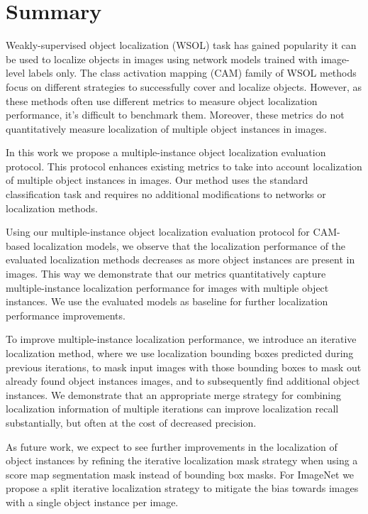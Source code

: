 \chapter*{Summary}

Weakly-supervised object localization (WSOL) task has gained popularity it can be used to localize objects in images using network models trained with image-level labels only. The class activation mapping (CAM) family of WSOL methods focus on different strategies to successfully cover and localize objects. However, as these methods often use different metrics to measure object localization performance, it's difficult to benchmark them. Moreover, these metrics do not quantitatively measure localization of multiple object instances in images.

In this work we propose a multiple-instance object localization evaluation protocol. This protocol enhances existing metrics to take into account localization of multiple object instances in images. Our method uses the standard classification task and requires no additional modifications to networks or localization methods.

Using our multiple-instance object localization evaluation protocol for CAM-based localization models, we observe that the localization performance of the evaluated localization methods decreases as more object instances are present in images. This way we demonstrate that our metrics quantitatively capture multiple-instance localization performance for images with multiple object instances. We use the evaluated models as baseline for further localization performance improvements.

To improve multiple-instance localization performance, we introduce an iterative localization method, where we use localization bounding boxes predicted during previous iterations, to mask input images with those bounding boxes to mask out already found object instances images, and to subsequently find additional object instances. We demonstrate that an appropriate merge strategy for combining localization information of multiple iterations can improve localization recall substantially, but often at the cost of decreased precision. 

As future work, we expect to see further improvements in the localization of object instances by refining the iterative localization mask strategy when using a score map segmentation mask instead of bounding box masks. For ImageNet we propose a split iterative localization strategy to mitigate the bias towards images with a single object instance per image.